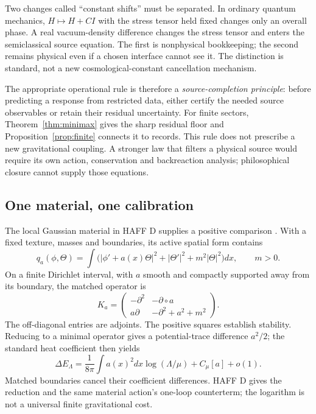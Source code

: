 \documentclass[12pt,a4paper]{article}
\theoremstyle{definition}
\begin{document}
Two changes called ``constant shifts'' must be separated. In ordinary
quantum mechanics, $H\mapsto H+CI$ with the stress tensor held fixed
changes only an overall phase. A real vacuum-density difference changes
the stress tensor and enters the semiclassical source equation. The first
is nonphysical bookkeeping; the second remains physical even if a chosen
interface cannot see it. The distinction is standard, not a new
cosmological-constant cancellation mechanism.

The appropriate operational rule is therefore a \emph{source-completion
principle}: before predicting a response from restricted data, either
certify the needed source observables or retain their residual uncertainty.
For finite sectors, Theorem~\ref{thm:minimax} gives the sharp residual
floor and Proposition~\ref{prop:finite} connects it to records. This rule
does not prescribe a new gravitational coupling. A stronger law that
filters a physical source would require its own action, conservation and
backreaction analysis; philosophical closure cannot supply those equations.

\subsection{One material, one calibration}
\label{sec:material-vacuum}

The local Gaussian material in HAFF D supplies a positive comparison
\cite{Liu2026HAFFD}. With a fixed texture, masses and boundaries, its
active spatial form contains
\begin{equation}
 q_a(\phi,\Theta)=\int
 \bigl(|\phi'+a(x)\Theta|^2+|\Theta'|^2+m^2|\Theta|^2\bigr)dx,
 \qquad m>0.
\end{equation}
On a finite Dirichlet interval, with $a$ smooth and compactly supported
away from its boundary, the matched operator is
\begin{equation}
 K_a=\begin{pmatrix}-\partial^2&-\partial\circ a\\
                    a\partial&-\partial^2+a^2+m^2\end{pmatrix}.
\end{equation}
The off-diagonal entries are adjoints. The positive squares establish
stability. Reducing to a minimal operator gives a potential-trace
difference $a^2/2$; the standard heat coefficient
\cite{Vassilevich2003} then yields
\begin{equation}
 \Delta E_\Lambda
 =\frac1{8\pi}\int a(x)^2dx\log(\Lambda/\mu)+C_\mu[a]+o(1).
 \label{eq:vacuumlog}
\end{equation}
Matched boundaries cancel their coefficient differences. HAFF D gives
the reduction and the same material action's one-loop counterterm; the
logarithm is not a universal finite gravitational cost.
\end{document}
